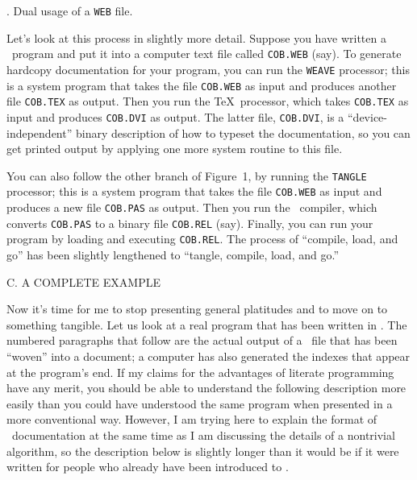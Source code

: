 \bigskip
\centerline{\vbox{
    }}
\nobreak\medskip
\caption 1. Dual usage of a {\tt WEB} file.
\bigbreak

Let's look at this process in slightly more detail. Suppose you have
written a \WEB\ program and put it into a computer text file called
{\tt COB.WEB} (say). To generate hardcopy documentation for your program,
you can run the {\tt WEAVE} processor; this is a system program that takes
the file {\tt COB.WEB} as input and produces another file {\tt COB.TEX}
as output. Then you run the \TeX\ processor, which takes {\tt COB.TEX}
as input and produces {\tt COB.DVI} as output. The latter file,
{\tt COB.DVI}, is a ``device-independent'' binary description of how
to typeset the documentation, so you can get printed output by applying
one more system routine to this file.

You can also follow the other branch of Figure~1, by running the
{\tt TANGLE} processor; this is a system program that takes the file
{\tt COB.WEB} as input and produces a new file {\tt COB.PAS} as output.
Then you run the \PASCAL\ compiler, which converts {\tt COB.PAS} to
a binary file {\tt COB.REL} (say). Finally, you can run your program
by loading and executing {\tt COB.REL}. The process of ``compile, load,
and go'' has been slightly lengthened to ``tangle, compile, load, and go.''

\beginsection C. A COMPLETE EXAMPLE

Now it's time for me to stop presenting general platitudes and to move on
to something tangible. Let us look at a real program that has been written
in \WEB. The numbered paragraphs that follow are the actual output of a
\WEB\ file that has been ``woven'' into a document; a computer has also
generated the indexes that appear at the program's end. If my claims for
the advantages of literate programming have any merit, you should be able
to understand the following description more easily than you could
have understood the same program when presented in a more conventional
way. However, I am trying here to explain the format of \WEB\ documentation
at the same time as I am discussing the details of a nontrivial algorithm,
so the description below is slightly longer than it would be if it were
written for people who already have been introduced to \WEB.

